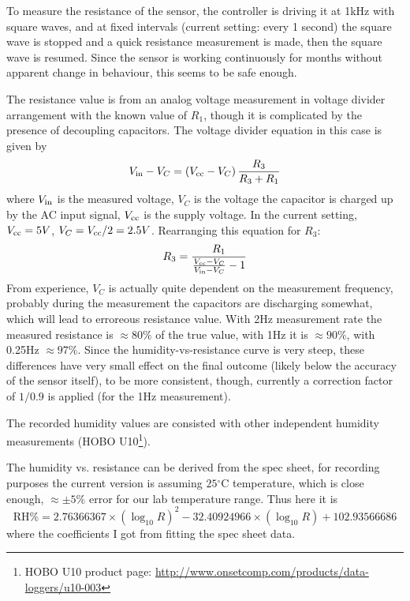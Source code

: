 \documentclass[12pt,a4paper]{article}
\begin{document}
To measure the resistance of the sensor, the controller is driving it at 1kHz with square waves, and at fixed intervals (current setting: every 1 second) the square wave is stopped and a quick resistance measurement is made, then the square wave is resumed. Since the sensor is working continuously for months without apparent change in behaviour, this seems to be safe enough.

The resistance value is from an analog voltage measurement in voltage divider arrangement with the known value of $R_1$, though it is complicated by the presence of decoupling capacitors. The voltage divider equation in this case is given by
\begin{equation}
V_{\rm in} - V_C = \left(V_{\rm cc} - V_C \right) \frac{R_3}{R_3 + R_1}
\end{equation}
where $V_{\rm in}$ is the measured voltage, $V_C$ is the voltage the capacitor is charged up by the AC input signal, $V_{\rm cc}$ is the supply voltage. In the current setting, $V_{\rm cc} = 5V$, $V_C = V_{\rm cc} / 2 = 2.5V$. Rearranging this equation for $R_3$:
\begin{equation}
R_3 = \frac{R_1}{\frac{V_{\rm cc} - V_C}{V_{\rm in} - V_C} - 1}
\end{equation}
From experience, $V_C$ is actually quite dependent on the measurement frequency, probably during the measurement the capacitors are discharging somewhat, which will lead to erroreous resistance value. With 2Hz measurement rate the measured resistance is $\approx 80\%$ of the true value, with 1Hz it is $\approx 90\%$, with 0.25Hz $\approx 97\%$. Since the humidity-vs-resistance curve is very steep, these differences have very small effect on the final outcome (likely below the accuracy of the sensor itself), to be more consistent, though, currently a correction factor of $1/0.9$ is applied (for the 1Hz measurement).

The recorded humidity values are consisted with other independent humidity measurements (HOBO U10\footnote{HOBO U10 product page: \url{http://www.onsetcomp.com/products/data-loggers/u10-003}}).

The humidity vs. resistance can be derived from the spec sheet, for recording purposes the current version is assuming $25\mathrm{^\circ C}$ temperature, which is close enough, $\approx \pm 5 \% $ error for our lab temperature range. Thus here it is
\begin{equation}
\mathrm{RH\%} =  2.76366367 \times (\log_{10} R) ^ 2 - 32.40924966 \times (\log_{10}R) + 102.93566686
\end{equation}
where the coefficients I got from fitting the spec sheet data.
\end{document}
